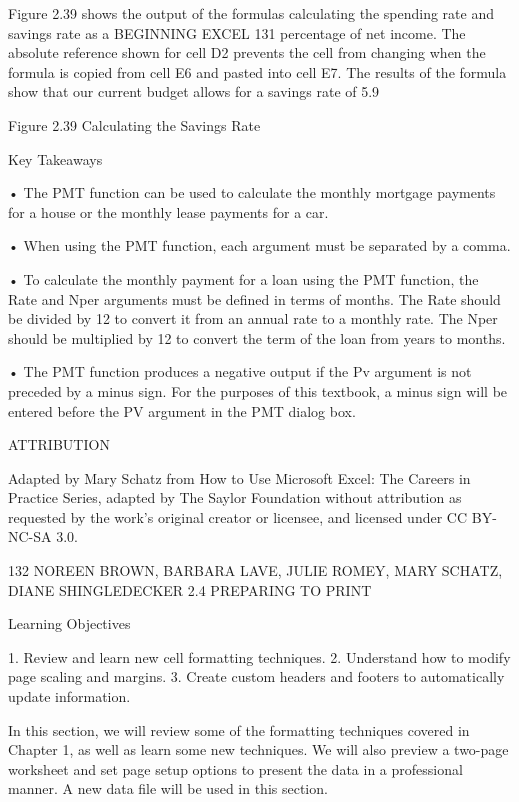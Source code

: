 Figure 2.39 shows the output of the formulas calculating the spending rate and savings rate as a
BEGINNING EXCEL 131
percentage of net income. The absolute reference shown for cell D2 prevents the cell from changing
when the formula is copied from cell E6 and pasted into cell E7. The results of the formula show that
our current budget allows for a savings rate of 5.9%




Figure 2.39 Calculating the Savings Rate




Key Takeaways


• The PMT function can be used to calculate the monthly mortgage payments for a house or the monthly lease
payments for a car.

• When using the PMT function, each argument must be separated by a comma.

• To calculate the monthly payment for a loan using the PMT function, the Rate and Nper arguments must be
defined in terms of months. The Rate should be divided by 12 to convert it from an annual rate to a monthly
rate. The Nper should be multiplied by 12 to convert the term of the loan from years to months.

• The PMT function produces a negative output if the Pv argument is not preceded by a minus sign. For the
purposes of this textbook, a minus sign will be entered before the PV argument in the PMT dialog box.



ATTRIBUTION

Adapted by Mary Schatz from How to Use Microsoft Excel: The Careers in Practice Series, adapted
by The Saylor Foundation without attribution as requested by the work’s original creator or
licensee, and licensed under CC BY-NC-SA 3.0.

132 NOREEN BROWN, BARBARA LAVE, JULIE ROMEY, MARY SCHATZ, DIANE SHINGLEDECKER
2.4 PREPARING TO PRINT




Learning Objectives


1. Review and learn new cell formatting techniques.
2. Understand how to modify page scaling and margins.
3. Create custom headers and footers to automatically update information.



In this section, we will review some of the formatting techniques covered in Chapter 1, as well as
learn some new techniques. We will also preview a two-page worksheet and set page setup options to
present the data in a professional manner. A new data file will be used in this section.




